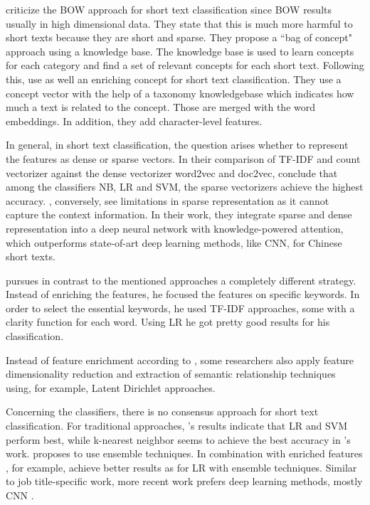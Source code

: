 \documentclass[12pt, a4paper, titlepage]{article}
\begin{document}
\citep{WangF2014} criticize the \ac{BOW} approach for short text classification since \ac{BOW} results usually in high dimensional data. They state that this is much more harmful to short texts because they are short and sparse. They propose a ``bag of concept" approach using a knowledge base. The knowledge base is used to learn concepts for each category and find a set of relevant concepts for each short text. Following this, \citep{wang2017J} use as well an enriching concept for short text classification. They use a concept vector with the help of a taxonomy knowledgebase which indicates how much a text is related to the concept. Those are merged with the word embeddings. In addition, they add character-level features. 

In general, in short text classification, the question arises whether to represent the features as dense or sparse vectors. In their comparison of \ac{TF-IDF} and count vectorizer against the dense vectorizer word2vec and doc2vec, \cite{WangY2017} conclude that among the classifiers \ac{NB}, \ac{LR} and \ac{SVM}, the sparse vectorizers achieve the highest accuracy. \cite{Chen2019}, conversely, see limitations in sparse representation as it cannot capture the context information. In their work, they integrate sparse and dense representation into a deep neural network with knowledge-powered attention, which outperforms state-of-art deep learning methods, like \ac{CNN}, for Chinese short texts. 

\citet{sun2012} pursues in contrast to the mentioned approaches a completely different strategy. Instead of enriching the features, he focused the features on specific keywords. In order to select the essential keywords, he used \ac{TF-IDF} approaches, some with a clarity function for each word. Using \ac{LR} he got pretty good results for his classification.

Instead of feature enrichment according to \citet{Song2014}, some researchers also apply feature dimensionality reduction and extraction of semantic relationship techniques using, for example, Latent Dirichlet approaches.

Concerning the classifiers, there is no consensus approach for short text classification. For traditional approaches, \cite{WangY2017}'s results indicate that \ac{LR} and \ac{SVM} perform best, while k-nearest neighbor seems to achieve the best accuracy in \cite{Khamar2013}'s work. \citet{Song2014} proposes to use ensemble techniques. In combination with enriched features \citet{Bouaziz2014}, for example, achieve better results as for \ac{LR} with ensemble techniques. Similar to job title-specific work, more recent work prefers deep learning methods, mostly \ac{CNN} \citep{Chen2019}. 
\end{document}

